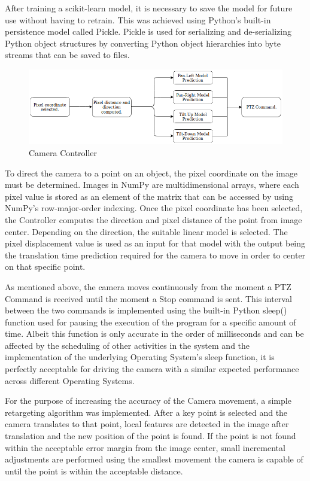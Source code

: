 \documentclass{l4proj}
\begin{document}
After training a scikit-learn model, it is necessary to save the model for future use without having to retrain. This was achieved using Python's built-in persistence model called Pickle. Pickle is used for serializing and de-serializing Python object structures by converting Python object hierarchies into byte streams that can be saved to files.

\begin{figure}[ht]
    \centering
    \includegraphics[width=1\textwidth]{l4template-master/images/Controller.png}
    \caption{Camera Controller}
    \label{controllerarchitecture}
\end{figure}

To direct the camera to a point on an object, the pixel coordinate on the image must be determined. Images in NumPy are multidimensional arrays, where each pixel value is stored as an element of the matrix that can be accessed by using NumPy's row-major-order indexing. Once the pixel coordinate has been selected, the Controller computes the direction and pixel distance of the point from image center. Depending on the direction, the suitable linear model is selected. The pixel displacement value is used as an input for that model with the output being the translation time prediction required for the camera to move in order to center on that specific point.

As mentioned above, the camera moves continuously from the moment a PTZ Command is received until the moment a Stop command is sent. This interval between the two commands is implemented using the built-in Python sleep() function used for pausing the execution of the program for a specific amount of time. Albeit this function is only accurate in the order of milliseconds and can be affected by the scheduling of other activities in the system and the implementation of the underlying Operating System's sleep function, it is perfectly acceptable for driving the camera with a similar expected performance across different Operating Systems.  

For the purpose of increasing the accuracy of the Camera movement, a simple retargeting algorithm was implemented. After a key point is selected and the camera translates to that point, local features are detected in the image after translation and the new position of the point is found. If the point is not found within the acceptable error margin from the image center, small incremental adjustments are performed using the smallest movement the camera is capable of until the point is within the acceptable distance. 
\end{document}

